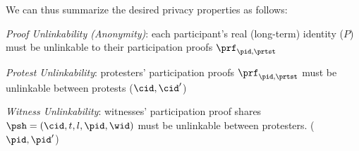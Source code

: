 We can thus summarize the desired privacy properties as follows:
\begin{requirements}[P]
\item\label{ProofUnlink} \emph{Proof Unlinkability (Anonymity)}: each
  participant's real (long-term) identity (\(P\)) must be unlinkable to their participation proofs \(\prf_{\pid, \prtst}\)
\item\label{ProtestUnlink} \emph{Protest Unlinkability}: protesters' participation proofs \(\prf_{\pid, \prtst}\) must be 
  unlinkable between protests (\(\cid, \cid' \))
\item\label{WitnessUnlink}\emph{Witness Unlinkability}:  witnesses' participation proof shares \(\psh = (\cid, t, l, \pid,\wid)\) 
must be unlinkable between 
  protesters. (\(\pid, \pid' \))
\end{requirements}


